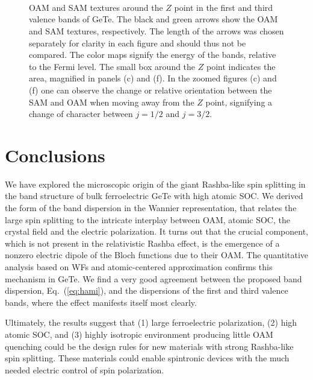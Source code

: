 \begin{figure*}[t!]
  ~
  \\
  ~
  ~
  \\
  ~
  ~
  \caption{\label{fig:Rashba_textures} OAM and SAM textures around the $Z$ point in the first and third valence bands of GeTe. The black and green arrows show the OAM and SAM textures, respectively. The length of the arrows was chosen separately for clarity in each figure and should thus not be compared. The color maps signify the energy of the bands, relative to the Fermi level. The small box around the $Z$ point indicates the area, magnified in panels (c) and (f). In the zoomed figures (c) and (f) one can observe the change or relative orientation between the SAM and OAM when moving away from the $Z$ point, signifying a change of character between $j=1/2$ and $j=3/2$.}
\end{figure*}

\section{Conclusions}

We have explored the microscopic origin of the giant Rashba-like spin splitting in the band structure of bulk ferroelectric GeTe with high atomic SOC. We derived the form of the band dispersion in the Wannier representation, that relates the large spin splitting to the intricate interplay between OAM, atomic SOC, the crystal field and the electric polarization. It turns out that the crucial component, which is not present in the relativistic Rashba effect, is the emergence of a nonzero electric dipole of the Bloch functions due to their OAM. The quantitative analysis based on WFs and atomic-centered approximation confirms this mechanism in GeTe. We find a very good agreement between the proposed band dispersion, Eq.~(\ref{eq:hami}), and the dispersions of the first and third valence bands, where the effect manifests itself most clearly.

Ultimately, the results suggest that (1) large ferroelectric polarization, (2) high atomic SOC, and (3) highly isotropic environment producing little OAM quenching could be the design rules for new materials with strong Rashba-like spin splitting. These materials could enable spintronic devices with the much needed electric control of spin polarization.

\printbibliography


